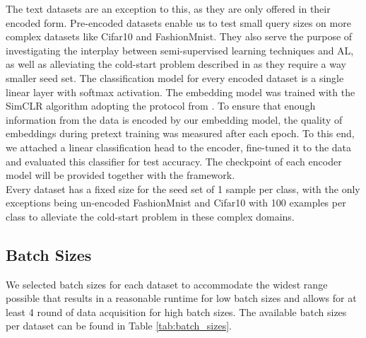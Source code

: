 \documentclass[]{article}
\begin{document}
The text datasets are an exception to this, as they are only offered in their encoded form.
Pre-encoded datasets enable us to test small query sizes on more complex datasets like Cifar10 and FashionMnist.
They also serve the purpose of investigating the interplay between semi-supervised learning techniques and AL, as well as alleviating the cold-start problem described in \cite{luth2024navigating} as they require a way smaller seed set.
The classification model for every encoded dataset is a single linear layer with softmax activation.
The embedding model was trained with the SimCLR \cite{chen2020simple} algorithm adopting the protocol from \cite{hacohen2022active}. 
To ensure that enough information from the data is encoded by our embedding model, the quality of embeddings during pretext training was measured after each epoch.
To this end, we attached a linear classification head to the encoder, fine-tuned it to the data and evaluated this classifier for test accuracy. 
The checkpoint of each encoder model will be provided together with the framework. \\ [1mm]
Every dataset has a fixed size for the seed set of 1 sample per class, with the only exceptions being un-encoded FashionMnist and Cifar10 with 100 examples per class to alleviate the cold-start problem in these complex domains. 

\subsection{Batch Sizes}\label{sec:batch_sizes}
We selected batch sizes for each dataset to accommodate the widest range possible that results in a reasonable runtime for low batch sizes and allows for at least 4 round of data acquisition for high batch sizes.
The available batch sizes per dataset can be found in Table \ref{tab:batch_sizes}.

\end{document}
